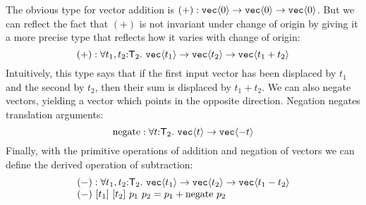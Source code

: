 \documentclass{sigplanconf}
\newcommand{\SynTransl}[1]{\mathsf{T}_#1}
\newcommand{\tyPrim}[2]{\textup{\texttt{#1}}\langle #2 \rangle}
\theoremstyle{examplestyle}
\theoremstyle{restatementstyle}
\begin{document}
The obvious type for vector addition is
$  (+) : \tyPrim{vec}{0} \to \tyPrim{vec}{0} \to \tyPrim{vec}{0}$.
But we can reflect the fact that $(+)$ is not invariant under change
of origin by giving it a more precise type that reflects how it varies
with change of origin:
\begin{displaymath}
  (+) : \forall t_1, t_2 \mathord: \SynTransl{2}.\ \tyPrim{vec}{t_1}
  \to \tyPrim{vec}{t_2} \to \tyPrim{vec}{t_1 + t_2}
\end{displaymath}
Intuitively, this type says that if the first input vector has been
displaced by $t_1$ and the second by $t_2$, then their sum is
displaced by $t_1 + t_2$. We can also negate vectors, yielding a
vector which points in the opposite direction. Negation negates
translation arguments:
\begin{displaymath}
  \mathrm{negate} : \forall t \mathord:
  \SynTransl{2}.\ \tyPrim{vec}{t} \to \tyPrim{vec}{-t}
\end{displaymath}
Finally, with the primitive operations of addition and negation of
vectors we can define the derived operation of subtraction:
\begin{displaymath}
  \begin{array}{l}
    (-) : \forall t_1,t_2 \mathord:\SynTransl{2}.\ \tyPrim{vec}{t_1}
    \to \tyPrim{vec}{t_2} \to \tyPrim{vec}{t_1 - t_2}
    \\ (-)\ [t_1]\ [t_2]\ p_1\ p_2 = p_1 + \mathrm{negate}\ p_2
  \end{array}
\end{displaymath}
\end{document}
